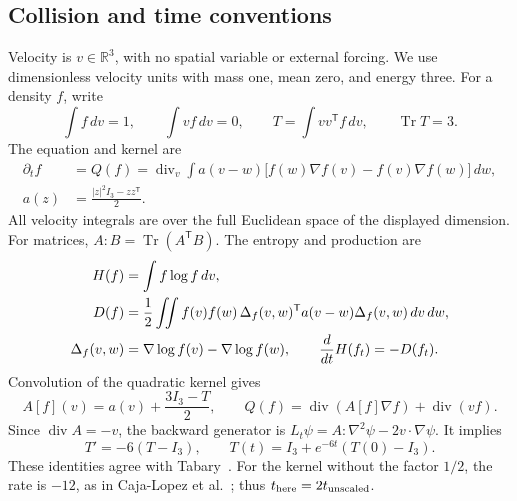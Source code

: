 \documentclass[11pt]{article}
\numberwithin{equation}{section}
\newcommand{\R}{\mathbb R}
\newcommand{\tr}{\operatorname{Tr}}
\newcommand{\diver}{\operatorname{div}}
\begin{document}
\subsection{Collision and time conventions}
Velocity is \(v\in\R^3\), with no spatial variable or external forcing.
We use dimensionless velocity units with mass one, mean zero, and energy
three. For a density \(f\), write
\begin{equation}\label{eq:moments}
 \int f\,dv=1,\qquad \int vf\,dv=0,\qquad
 T=\int vv^{\mathsf T}f\,dv,\qquad\tr T=3.
\end{equation}
The equation and kernel are
\begin{align}
 \partial_t f&=Q(f)
 =\diver_v\int a(v-w)
 \bigl[f(w)\nabla f(v)-f(v)\nabla f(w)\bigr]\,dw,
 \label{eq:equation}\\
 a(z)&=\frac{|z|^2I_3-zz^{\mathsf T}}2.
 \label{eq:kernel}
\end{align}
All velocity integrals are over the full Euclidean space of the displayed
dimension. For matrices, \(A:B=\tr(A^{\mathsf T}B)\). The entropy and
production are
\begin{align}
 H(f)&=\int f\log f\,dv,\notag\\
 D(f)&=\frac12\iint f(v)f(w)\,
  \Delta_f(v,w)^{\mathsf T}a(v-w)\Delta_f(v,w)\,dv\,dw,
 \label{eq:D}\\
 \Delta_f(v,w)&=\nabla\log f(v)-\nabla\log f(w),\qquad
 \frac{d}{dt}H(f_t)=-D(f_t).\notag
\end{align}
Convolution of the quadratic kernel gives
\begin{equation}\label{eq:diffusion}
 A[f](v)=a(v)+\frac{3I_3-T}{2},\qquad
 Q(f)=\diver(A[f]\nabla f)+\diver(vf).
\end{equation}
Since \(\diver A=-v\), the backward generator is
\(L_t\psi=A:\nabla^2\psi-2v\cdot\nabla\psi\). It implies
\begin{equation}\label{eq:covariance}
 T'=-6(T-I_3),\qquad T(t)=I_3+e^{-6t}(T(0)-I_3).
\end{equation}
These identities agree with Tabary~\cite[Lemmas 2.1--2.2]{Tabary2026}.
For the kernel without the factor \(1/2\), the rate is \(-12\), as in
Caja-Lopez et al.~\cite[Proposition 2]{Caja2025}; thus
\(t_{\rm here}=2t_{\rm unscaled}\).
\end{document}
